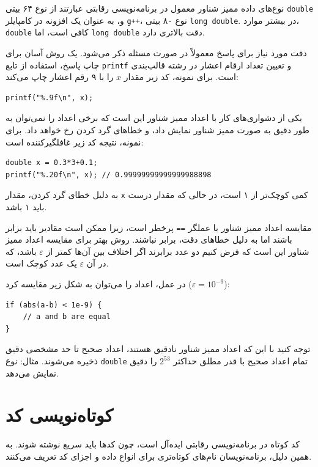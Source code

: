 
نوع‌های داده ممیز شناور معمول در
برنامه‌نویسی رقابتی عبارتند از
نوع ۶۴ بیتی \texttt{double}
و، به عنوان یک افزونه در کامپایلر \texttt{g++}،
نوع ۸۰ بیتی \texttt{long double}.
در بیشتر موارد، \texttt{double} کافی است،
اما \texttt{long double} دقت بالاتری دارد.

دقت مورد نیاز برای پاسخ معمولاً
در صورت مسئله ذکر می‌شود.
یک روش آسان برای چاپ پاسخ، استفاده از
تابع \texttt{printf}
و تعیین تعداد ارقام اعشار
در رشته قالب‌بندی است.
برای نمونه، کد زیر مقدار $x$ را
با ۹ رقم اعشار چاپ می‌کند:

\begin{lstlisting}
printf("%.9f\n", x);
\end{lstlisting}

یکی از دشواری‌های کار با اعداد ممیز شناور
این است که برخی اعداد را نمی‌توان به طور دقیق
به صورت ممیز شناور نمایش داد،
و خطاهای گرد کردن رخ خواهد داد.
برای نمونه، نتیجه کد زیر
غافلگیرکننده است:

\begin{lstlisting}
double x = 0.3*3+0.1;
printf("%.20f\n", x); // 0.99999999999999988898
\end{lstlisting}

به دلیل خطای گرد کردن،
مقدار \texttt{x} کمی کوچک‌تر از ۱ است،
در حالی که مقدار درست باید ۱ باشد.

مقایسه اعداد ممیز شناور با عملگر \texttt{==}
پرخطر است،
زیرا ممکن است مقادیر باید برابر باشند
اما به دلیل خطاهای دقت، برابر نباشند.
روش بهتر برای مقایسه اعداد ممیز شناور
این است که فرض کنیم دو عدد برابرند
اگر اختلاف بین آن‌ها کمتر از $\varepsilon$ باشد،
که در آن $\varepsilon$ یک عدد کوچک است.

در عمل، اعداد را می‌توان به شکل زیر
مقایسه کرد ($\varepsilon=10^{-9}$):

\begin{lstlisting}
if (abs(a-b) < 1e-9) {
    // a and b are equal
}
\end{lstlisting}

توجه کنید با این که اعداد ممیز شناور نادقیق هستند،
اعداد صحیح تا حد مشخصی دقیق ذخیره می‌شوند.
مثال: نوع \texttt{double} تمام اعداد صحیح
با قدر مطلق حداکثر $2^{53}$ را دقیق نمایش می‌دهد.

\section{کوتاه‌نویسی کد}

کد کوتاه در برنامه‌نویسی رقابتی ایده‌آل است،
چون کدها باید سریع نوشته شوند.
به همین دلیل، برنامه‌نویسان نام‌های کوتاه‌تری
برای انواع داده و اجزای کد تعریف می‌کنند.

